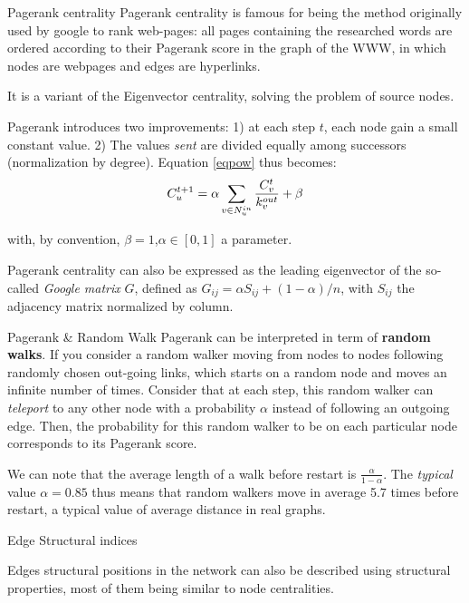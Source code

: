 \begin{textbox}{Pagerank centrality}
    Pagerank centrality is famous for being the method originally used by google to rank web-pages: all pages containing the researched words are ordered according to their Pagerank score in the graph of the WWW, in which nodes are webpages and edges are hyperlinks.

    It is a variant of the Eigenvector centrality, solving the problem of source nodes.

    Pagerank introduces two improvements: 1) at each step $t$, each node gain a small constant value. 2) The values \textit{sent} are divided equally among successors (normalization by degree). Equation \ref{eqpow} thus becomes:
    \begin{equation}
        \centering
        C^{t+1}_u = \alpha \sum_{v\in N^{in}_u} \frac{C^t_v}{k^{out}_v} + \beta
    \end{equation}

    with, by convention, $\beta=1$,$\alpha \in [0,1]$ a parameter.

    Pagerank centrality can also be expressed as the leading eigenvector of the so-called \textit{Google matrix} $G$, defined as $G_{ij} = \alpha S_{ij} + (1- \alpha)/n$, with $S_{ij}$ the adjacency matrix normalized by column.
\end{textbox}

\begin{textbox}{Pagerank \& Random Walk}
    Pagerank can be interpreted in term of \textbf{random walks}. If you consider a random walker moving from nodes to nodes following randomly chosen out-going links, which starts on a random node and moves an infinite number of times. Consider that at each step, this random walker can \textit{teleport} to any other node with a probability $\alpha$ instead of following an outgoing edge. Then, the probability for this random walker to be on each particular node corresponds to its Pagerank score.

    We can note that the average length of a walk before restart is $\frac{\alpha}{1-\alpha}$. The \textit{typical} value $\alpha=0.85$ thus means that random walkers move in average 5.7 times before restart, a typical value of average distance in real graphs.
\end{textbox}

\begin{textbox}{Edge Structural indices}

    Edges structural positions in the network can also be described using structural properties, most of them being similar to node centralities.
\end{textbox}

